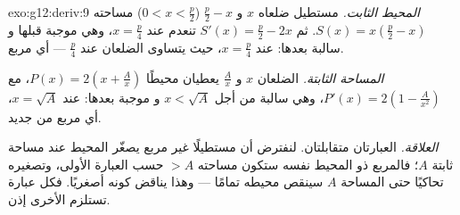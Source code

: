 \begin{solution}{exo:g12:deriv:9}
\emph{المحيط الثابت.} مستطيل ضلعاه $x$ و $\frac{p}{2} - x$
($0 < x < \frac p2$) مساحته $S(x) = x\left(\frac p2 - x\right)$. ثم
$S'(x) = \frac p2 - 2x$ تنعدم عند $x = \frac p4$، وهي موجبة قبلها و
سالبة بعدها:  عند $x = \frac{p}{4}$، حيث يتساوى الضلعان
عند $\frac p4$ --- أي مربع.

\emph{المساحة الثابتة.} الضلعان $x$ و $\frac Ax$ يعطيان محيطًا
$P(x) = 2\left(x + \frac Ax\right)$، مع
$P'(x) = 2\left(1 - \frac{A}{x^2}\right)$، وهي سالبة من أجل $x < \sqrt A$ و
موجبة بعدها:  عند $x = \sqrt{A}$، أي مربع من جديد.

\emph{العلاقة.} العبارتان متقابلتان. لنفترض أن مستطيلًا غير مربع
يصغّر المحيط عند مساحة ثابتة $A$؛ فالمربع ذو المحيط نفسه
ستكون مساحته $> A$ حسب العبارة الأولى، وتصغيره تحاكيًا
حتى المساحة $A$ سينقص محيطه تمامًا --- وهذا يناقض
كونه أصغريًا. فكل عبارة تستلزم الأخرى إذن.
\end{solution}

